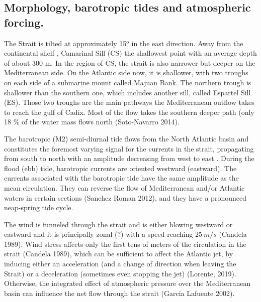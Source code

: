 \color{blue}\subsection{Morphology, barotropic tides and atmospheric forcing.} \color{black}


The Strait is \color{blue} tilted at approximately \color{black} 15$^\text{o}$ in the east direction. Away from \color{blue}the continental shelf \color{black}, Camarinal Sill (CS) the shallowest point with \color{blue}an average depth of about 300 m. In the region of CS, the strait is also narrower but deeper on the Mediterranean side. \color{black} On the Atlantic side now, it is shallower, with two troughs on each side of a submarine mount called Majuan Bank. The northern trough is shallower than the southern one, which includes another sill, called Espartel Sill (ES). Those two troughs are the main pathways the \color{blue}Mediterranean outflow takes \color{black} to \color{blue} reach \color{black} the gulf of Cadix. Most of the flow takes the southern deeper path \color{blue}(only 18 \% of the water mass flows north (Soto-Navarro 2014)\color{black}.

The barotropic (M2) semi-diurnal tide \color{blue} flows \color{black} from the North Atlantic \color{blue}basin and constitutes \color{black} the foremost varying signal for the currents in the strait, propagating from south to north with an amplitude decreasing from west to east \citep{candela_1990}. During the flood (ebb) tide, barotropic currents are oriented westward (eastward). The currents associated with the barotropic tide \color{blue} have the \color{black} same amplitude as the mean circulation\color{blue}. They \color{black} can reverse the flow of Mediterranean and/or Atlantic waters in certain sections (Sanchez Roman 2012), and they have a pronounced neap-spring tide cycle.

The wind is funneled through the strait and is either \color{blue}blowing westward or eastward and it is \color{black} principally zonal (?) with a speed \color{blue}reaching \color{black} $25\ m/s$ (Candela 1989). Wind stress affects only the first tens of meters of the circulation in the strait (Candela 1989), which can be sufficient to affect the Atlantic jet, by \color{blue}inducing either an acceleration (and a change of direction when leaving the Strait) or a deceleration (sometimes even stopping the jet) \color{black}(Lorente, 2019). Otherwise, the integrated effect of atmospheric pressure over the Mediterranean basin \color{blue} can \color{black} influence the net flow through the strait (Garcia Lafuente 2002).



